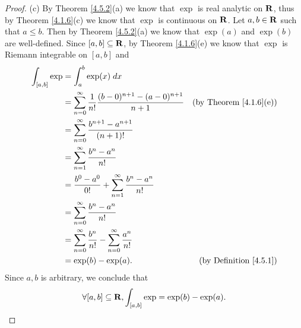 \begin{proof}{(c)}
    By Theorem \ref{4.5.2}(a) we know that \(\exp\) is real analytic on \(\mathbf{R}\), thus by Theorem \ref{4.1.6}(c) we know that \(\exp\) is continuous on \(\mathbf{R}\).
    Let \(a, b \in \mathbf{R}\) such that \(a \leq b\).
    Then by Theorem \ref{4.5.2}(a) we know that \(\exp(a)\) and \(\exp(b)\) are well-defined.
    Since \([a, b] \subseteq \mathbf{R}\), by Theorem \ref{4.1.6}(e) we know that \(\exp\) is Riemann integrable on \([a, b]\) and
    \begin{align*}
        \int_{[a, b]} \exp & = \int_a^b \exp(x) \; dx                                                                                                \\
                           & = \sum_{n = 0}^\infty \frac{1}{n!} \frac{(b - 0)^{n + 1} - (a - 0)^{n + 1}}{n + 1} & \text{(by Theorem \ref{4.1.6}(e))} \\
                           & = \sum_{n = 0}^\infty \frac{b^{n + 1} - a^{n + 1}}{(n + 1)!}                                                            \\
                           & = \sum_{n = 1}^\infty \frac{b^n - a^n}{n!}                                                                              \\
                           & = \frac{b^0 - a^0}{0!} + \sum_{n = 1}^\infty \frac{b^n - a^n}{n!}                                                       \\
                           & = \sum_{n = 0}^\infty \frac{b^n - a^n}{n!}                                                                              \\
                           & = \sum_{n = 0}^\infty \frac{b^n}{n!} - \sum_{n = 0}^\infty \frac{a^n}{n!}                                               \\
                           & = \exp(b) - \exp(a).                                                               & \text{(by Definition \ref{4.5.1})}
    \end{align*}
    Since \(a, b\) is arbitrary, we conclude that
    \[
        \forall [a, b] \subseteq \mathbf{R}, \int_{[a, b]} \exp = \exp(b) - \exp(a).
    \]
\end{proof}

